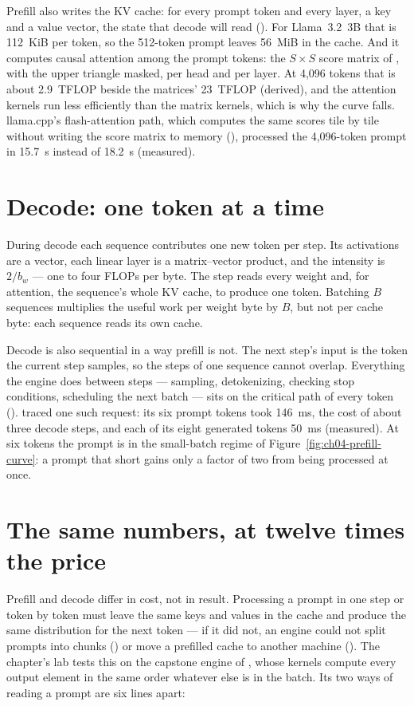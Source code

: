 Prefill also writes the KV cache: for every prompt token and every layer, a
key and a value vector, the state that decode will read ().
For Llama~3.2~3B that is 112~KiB per token, so the 512-token prompt leaves
56~MiB in the cache. And it computes causal attention among the prompt tokens:
the $S \times S$ score matrix of , with the upper triangle
masked, per head and per layer. At 4,096 tokens that is about 2.9~TFLOP beside
the matrices' 23~TFLOP (derived), and the attention kernels run less efficiently
than the matrix kernels, which is why the curve falls. llama.cpp's
flash-attention path, which computes the same scores tile by tile without
writing the score matrix to memory (), processed the
4,096-token prompt in 15.7~s instead of 18.2~s (measured).

\section{Decode: one token at a time}

During decode each sequence contributes one new token per step. Its
activations are a vector, each linear layer is a matrix--vector product, and
the intensity is $2/b_w$ --- one to four FLOPs per byte. The step reads every
weight and, for attention, the sequence's whole KV cache, to produce one
token. Batching $B$ sequences multiplies the useful work per weight byte by
$B$, but not per cache byte: each sequence reads its own cache.

Decode is also sequential in a way prefill is not. The next step's input is
the token the current step samples, so the steps of one sequence cannot
overlap. Everything the engine does between steps --- sampling, detokenizing,
checking stop conditions, scheduling the next batch --- sits on the critical
path of every token ().  traced
one such request: its six prompt tokens took 146~ms, the cost of about three
decode steps, and each of its eight generated tokens 50~ms (measured). At six
tokens the prompt is in the small-batch regime of
Figure~\ref{fig:ch04-prefill-curve}: a prompt that short gains only a factor of
two from being processed at once.

\section{The same numbers, at twelve times the price}

Prefill and decode differ in cost, not in result. Processing a prompt in one
step or token by token must leave the same keys and values in the cache and
produce the same distribution for the next token --- if it did not, an engine
could not split prompts into chunks () or move a
prefilled cache to another machine (). The
chapter's lab tests this on the capstone engine of , whose
kernels compute every output element in the same order whatever else is in the
batch. Its two ways of reading a prompt are six lines apart:

